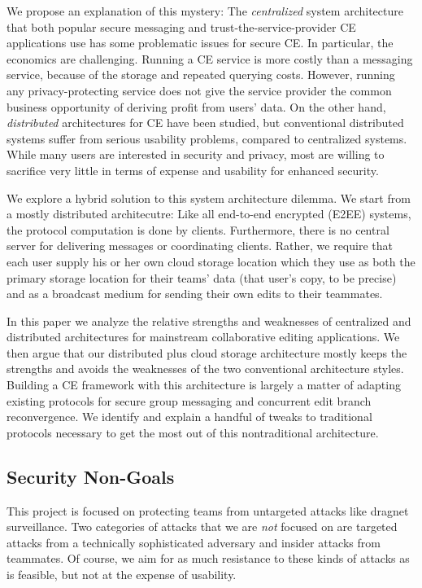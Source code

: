 \documentclass[runningheads]{llncs}
\begin{document}
We propose an explanation of this mystery: The \emph{centralized} system architecture that both popular secure messaging and trust-the-service-provider CE applications use has some problematic issues for secure CE.
In particular, the economics are challenging.
Running a CE service is more costly than a messaging service, because of the storage and repeated querying costs.
However, running any privacy-protecting service does not give the service provider the common business opportunity of deriving profit from users' data.
On the other hand, \emph{distributed} architectures for CE have been studied, but conventional distributed systems suffer from serious usability problems, compared to centralized systems.
While many users are interested in security and privacy, most are willing to sacrifice very little in terms of expense and usability for enhanced security.

We explore a hybrid solution to this system architecture dilemma.
We start from a mostly distributed architecutre: Like all end-to-end encrypted (E2EE) systems, the protocol computation is done by clients.
Furthermore, there is no central server for delivering messages or coordinating clients.
Rather, we require that each user supply his or her own cloud storage location which they use as both the primary storage location for their teams' data (that user's copy, to be precise) and as a broadcast medium for sending their own edits to their teammates.

In this paper we analyze the relative strengths and weaknesses of centralized and distributed architectures for mainstream collaborative editing applications.
We then argue that our distributed plus cloud storage architecture mostly keeps the strengths and avoids the weaknesses of the two conventional architecture styles.
Building a CE framework with this architecture is largely a matter of adapting existing protocols for secure group messaging and concurrent edit branch reconvergence.
We identify and explain a handful of tweaks to traditional protocols necessary to get the most out of this nontraditional architecture.

\subsection{Security Non-Goals}

This project is focused on protecting teams from untargeted attacks like dragnet surveillance.
Two categories of attacks that we are \emph{not} focused on are targeted attacks from a technically sophisticated adversary and insider attacks from teammates.
Of course, we aim for as much resistance to these kinds of attacks as is feasible, but not at the expense of usability.
\end{document}
